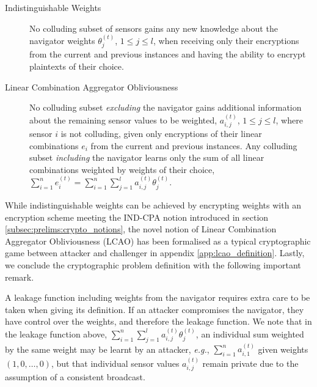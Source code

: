 \begin{description}
    \item[Indistinguishable Weights] No colluding subset of sensors gains any new knowledge about the navigator weights $\theta^{(t)}_j$, $1\leq j\leq l$, when receiving only their encryptions from the current and previous instances and having the ability to encrypt plaintexts of their choice.
    \item[Linear Combination Aggregator Obliviousness] No colluding subset \textit{excluding} the navigator gains additional information about the remaining sensor values to be weighted, $a^{(t)}_{i,j}$, $1\leq j\leq l$, where sensor $i$ is not colluding, given only encryptions of their linear combinations $e_i$ from the current and previous instances. Any colluding subset \textit{including} the navigator learns only the sum of all linear combinations weighted by weights of their choice, $\sum^{n}_{i=1}e_i^{(t)}=\sum^{n}_{i=1}\sum^{l}_{j=1} a^{(t)}_{i,j}\theta^{(t)}_j$.
\end{description}
While indistinguishable weights can be achieved by encrypting weights with an encryption scheme meeting the IND-CPA notion introduced in section \ref{subsec:prelims:crypto_notions}, the novel notion of Linear Combination Aggregator Obliviousness (LCAO) has been formalised as a typical cryptographic game between attacker and challenger in appendix \ref{app:lcao_definition}. Lastly, we conclude the cryptographic problem definition with the following important remark.
\begin{remark}
    A leakage function including weights from the navigator requires extra care to be taken when giving its definition. If an attacker compromises the navigator, they have control over the weights, and therefore the leakage function. We note that in the leakage function above, $\sum^n_{i=1}\sum^l_{j=1}a^{(t)}_{i,j}\theta^{(t)}_j$, an individual sum weighted by the same weight may be learnt by an attacker, \textit{e.g.}, $\sum^n_{i=1}a^{(t)}_{i,1}$ given weights $(1,0,\dots,0)$, but that individual sensor values $a^{(t)}_{i,j}$ remain private due to the assumption of a consistent broadcast.
\end{remark}

% 
% 

